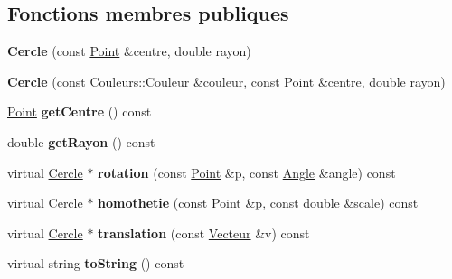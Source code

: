 \subsection*{Fonctions membres publiques}
\begin{DoxyCompactItemize}
\item 
\hypertarget{class_cercle_a3d45994e39b3b024cba60948f18e703e}{{\bfseries Cercle} (const \hyperlink{class_point}{Point} \&centre, double rayon)}\label{class_cercle_a3d45994e39b3b024cba60948f18e703e}

\item 
\hypertarget{class_cercle_ae152ca9e95f7da6c815ddef741eff8b0}{{\bfseries Cercle} (const Couleurs\+::\+Couleur \&couleur, const \hyperlink{class_point}{Point} \&centre, double rayon)}\label{class_cercle_ae152ca9e95f7da6c815ddef741eff8b0}

\item 
\hypertarget{class_cercle_ad107d1ad2b6e5e892fcb70d82f36ebdb}{\hyperlink{class_point}{Point} {\bfseries get\+Centre} () const }\label{class_cercle_ad107d1ad2b6e5e892fcb70d82f36ebdb}

\item 
\hypertarget{class_cercle_ad3ef93ca7d0f9fd73b888f1be9de3e88}{double {\bfseries get\+Rayon} () const }\label{class_cercle_ad3ef93ca7d0f9fd73b888f1be9de3e88}

\item 
\hypertarget{class_cercle_ab9c48b73db7a8467dea0200345ad1174}{virtual \hyperlink{class_cercle}{Cercle} $\ast$ {\bfseries rotation} (const \hyperlink{class_point}{Point} \&p, const \hyperlink{class_angle}{Angle} \&angle) const }\label{class_cercle_ab9c48b73db7a8467dea0200345ad1174}

\item 
\hypertarget{class_cercle_a631711475656f1ea3ceb4d7b035f008c}{virtual \hyperlink{class_cercle}{Cercle} $\ast$ {\bfseries homothetie} (const \hyperlink{class_point}{Point} \&p, const double \&scale) const }\label{class_cercle_a631711475656f1ea3ceb4d7b035f008c}

\item 
\hypertarget{class_cercle_a2cf96d253541d90b990672adbe6ef255}{virtual \hyperlink{class_cercle}{Cercle} $\ast$ {\bfseries translation} (const \hyperlink{class_vecteur}{Vecteur} \&v) const }\label{class_cercle_a2cf96d253541d90b990672adbe6ef255}

\item 
\hypertarget{class_cercle_a306c2e253da2f7c22b6fb17f9888941f}{virtual string {\bfseries to\+String} () const }\label{class_cercle_a306c2e253da2f7c22b6fb17f9888941f}


\end{DoxyCompactItemize}
